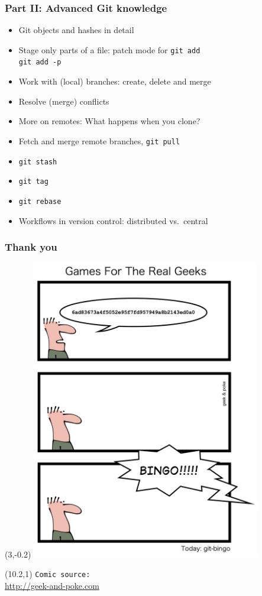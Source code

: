 \documentclass{gittalk}
\newcommand{\hlcommand}[1]{ %
\colorbox{base3}{\small \texttt{#1}}
}
\begin{document}
\begin{frame}
\frametitle{Part II: Advanced Git knowledge}
\begin{itemize}
  \item Git objects and hashes in detail
  \item Stage only parts of a file: patch mode for \texttt{git add} \\
  \hlcommand{git add -p}
  \item Work with (local) branches: create, delete and merge
  \item Resolve (merge) conflicts
  \item More on remotes: What happens when you clone?
  \item Fetch and merge remote branches, \hlcommand{git pull}
  \item \hlcommand{git stash}
  \item \hlcommand{git tag}
  \item \hlcommand{git rebase}
  \item Workflows in version control: distributed vs.~central
\end{itemize}
\end{frame}

\begin{frame}
\frametitle{Thank you}
\begin{textblock}{10}(3,-0.2)
  \includegraphics[width=0.75\textwidth]{./img/git-bingo.jpg}
\end{textblock}
\begin{textblock}{6}(10.2,1)
  \footnotesize
  \texttt{Comic source:}\\
  \url{http://geek-and-poke.com}
\end{textblock}
\end{frame}

\end{document}
